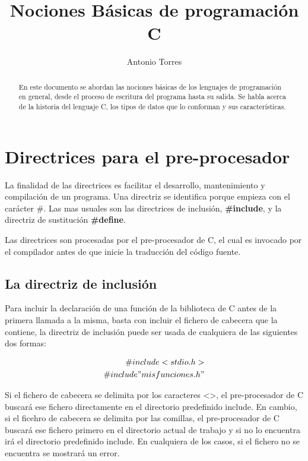 \documentclass[]{article}
\title{Nociones Básicas de programación C}
\author{Antonio Torres}
\begin{document}
\maketitle

\begin{abstract}
En este documento se abordan las nociones básicas de los lenguajes de programación en general, desde el proceso de escritura del programa hasta su salida. Se habla acerca de la historia del lenguaje C, los tipos de datos que lo conforman y sus características.
\end{abstract}

\tableofcontents

\pagebreak

\section{Directrices para el pre-procesador}
La finalidad de las directrices es facilitar el desarrollo, mantenimiento y compilación de un programa. Una directriz se identifica porque empieza con el carácter \#. Las mas usuales son las directrices de inclusión, \textbf{\#include}, y la directriz de sustitución \textbf{\#define}.

Las directrices son procesadas por el pre-procesador de C, el cual es invocado por el compilador antes de que inicie la traducción del código fuente.

\subsection{La directriz de inclusión}
Para incluir la declaración de una función de la biblioteca de C antes de la primera llamada a la misma, basta con incluir el fichero de cabecera que la contiene, la directriz de inclusión puede ser usada de cualquiera de las siguientes dos formas:

\begin{align}
	\# include <stdio.h> \\
	\#include "misfunciones.h"
\end{align}

Si el fichero de cabecera se delimita por los caracteres <>, el pre-procesador de C buscará ese fichero directamente en el directorio predefinido include. En cambio, si el ficehro de cabecera se delimita por las comillas, el pre-procesador de C buscará ese fichero primero en el directorio actual de trabajo y si no lo encuentra irá el directorio predefinido include. En cualquiera de los casos, si el fichero no se encuentra se mostrará un error.
\end{document}
